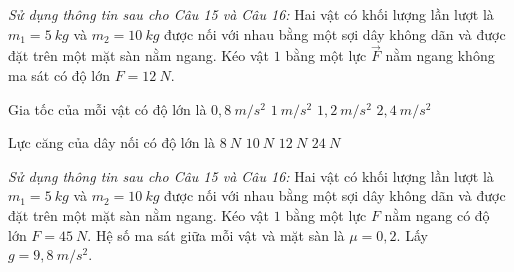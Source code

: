\textit{Sử dụng thông tin sau cho Câu 15 và Câu 16:} Hai vật có khối lượng lần lượt là $m_1=5\ kg$ và $m_2=10\ kg$ được nối với nhau bằng một sợi dây không dãn và được đặt trên một mặt sàn nằm ngang. Kéo vật $1$ bằng một lực $\vec F$ nằm ngang không ma sát có độ lớn $F=12\ N$.
\begin{ex}%
 Gia tốc của mỗi vật có độ lớn là
\choice
{\True $0,8\ m/s^2$}
{$1\ m/s^2$}
{$1,2\ m/s^2$}
{$2,4\ m/s^2$}
\end{ex}
\begin{ex}%
 Lực căng của dây nối có độ lớn là
\choice
{\True $8\ N$}
{$10\ N$}
{$12\ N$}
{$24\ N$}
\end{ex}
\textit{Sử dụng thông tin sau cho Câu 15 và Câu 16:} Hai vật có khối lượng lần lượt là $m_1=5\ kg$ và $m_2=10\ kg$ được nối với nhau bằng một sợi dây không dãn và được đặt trên một mặt sàn nằm ngang. Kéo vật $1$ bằng một lực $F$ nằm ngang có độ lớn $F=45\ N$. Hệ số ma sát giữa mỗi vật và mặt sàn là $\mu=0,2$. Lấy $g=9,8\ m/s^2$. 	
